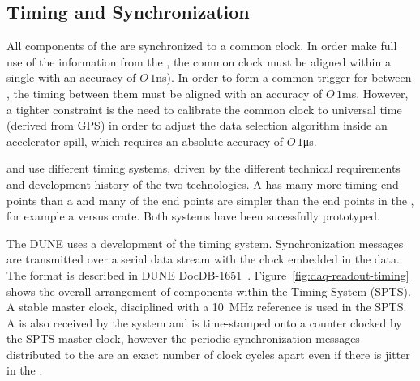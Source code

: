 \subsection{Timing and Synchronization}
\label{sec:fd-daq-timing}



All components of the  are
synchronized to a common clock.  In order make full use of the
information from the , the common clock must be
aligned within a single  with an accuracy of $O\,1$\si{ns}).
In order to form a common trigger for  between
, the timing between them must be aligned with an
accuracy of $O\,1$\si{ms}.  However, a tighter constraint is the need to
calibrate the common clock to universal time (derived from GPS) in
order to adjust the data selection algorithm inside an accelerator
spill, which requires an absolute accuracy of $O\,1$\si{\micro\s}.

\single and \dual {} use different timing systems,
driven by the different technical requirements and development history
of the two technologies. %
A  has many more
timing end points than a  and many of the end points
are simpler than the end points in the \dual{}, for example a 
versus  crate. Both systems have been sucessfully prototyped.

The DUNE  uses a development of the  
timing system. Synchronization messages are transmitted over a serial
data stream with the clock embedded in the data. The format is
described in DUNE DocDB-1651~\cite{docdb-1651}. Figure~\ref{fig:daq-readout-timing}
shows the overall arrangement of components within the \single
Timing System (SPTS). 
A stable master clock, disciplined with a \SI{10}{\MHz}
reference is used in the SPTS. A  is
also received by the system and is time-stamped onto a counter clocked
by the SPTS master clock, however the periodic synchronization
messages distributed to the   are an exact number
of clock cycles apart even if there is jitter in the .

